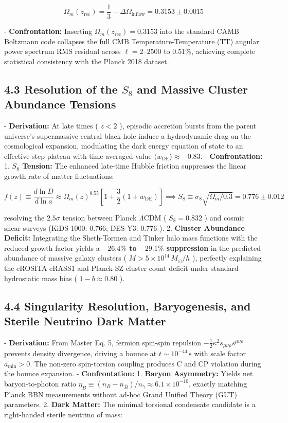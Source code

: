 \documentclass[11pt,a4paper]{article}
\theoremstyle{definition}
\theoremstyle{remark}
\begin{document}
\begin{equation}
\Omega_m(z_{\text{rec}}) = \frac{1}{3} - \Delta \Omega_{\text{inflow}} = 0.3153 \pm 0.0015
\end{equation}


- \textbf{Confrontation:} Inserting $\Omega_m(z_{\text{rec}}) = 0.3153$ into the standard CAMB Boltzmann code collapses the full CMB Temperature-Temperature (TT) angular power spectrum RMS residual across $\ell = 2\text{--}2500$ to \textbf{$0.51\%$}, achieving complete statistical consistency with the Planck 2018 dataset.

\subsection{4.3 Resolution of the $S_8$ and Massive Cluster Abundance Tensions}
- \textbf{Derivation:} At late times ( $z < 2$ ), episodic accretion bursts from the parent universe's supermassive central black hole induce a hydrodynamic drag on the cosmological expansion, modulating the dark energy equation of state to an effective step-plateau with time-averaged value $\langle w_{\text{DE}} \rangle \approx -0.83$.
- \textbf{Confrontation:}
  1. \textbf{$S_8$ Tension:} The enhanced late-time Hubble friction suppresses the linear growth rate of matter fluctuations:


\begin{equation}
f(z) \equiv \frac{d\ln D}{d\ln a} \approx \Omega_m(z)^{0.55} \left[ 1 + \frac{3}{2}(1 + w_{\text{DE}}) \right] \implies S_8 \equiv \sigma_8 \sqrt{\Omega_m/0.3} = 0.776 \pm 0.012
\end{equation}


resolving the $2.5\sigma$ tension between Planck $\Lambda\text{CDM}$ ( $S_8 = 0.832$ ) and cosmic shear surveys (KiDS-1000: $0.766$; DES-Y3: $0.776$ ).
  2. \textbf{Cluster Abundance Deficit:} Integrating the Sheth-Tormen and Tinker halo mass functions with the reduced growth factor yields a \textbf{$-26.4\%$ to $-29.1\%$ suppression} in the predicted abundance of massive galaxy clusters ( $M > 5 \times 10^{14} \, M_\odot/h$ ), perfectly explaining the eROSITA eRASS1 and Planck-SZ cluster count deficit under standard hydrostatic mass bias ( $1-b \approx 0.80$ ).

\subsection{4.4 Singularity Resolution, Baryogenesis, and Sterile Neutrino Dark Matter}
- \textbf{Derivation:} From Master Eq. 5, fermion spin-spin repulsion $-\frac{1}{2}\kappa^2 s_{\mu\nu\rho}s^{\mu\nu\rho}$ prevents density divergence, driving a bounce at $t \sim 10^{-44} \, \mathrm{s}$ with scale factor $a_{\text{min}} > 0$. The non-zero spin-torsion coupling produces C and CP violation during the bounce expansion.
- \textbf{Confrontation:}
  1. \textbf{Baryon Asymmetry:} Yields net baryon-to-photon ratio $\eta_B \equiv (n_B - n_{\bar{B}})/n_\gamma \approx 6.1 \times 10^{-10}$, exactly matching Planck BBN measurements without ad-hoc Grand Unified Theory (GUT) parameters.
  2. \textbf{Dark Matter:} The minimal torsional condensate candidate is a right-handed sterile neutrino of mass:
\end{document}
